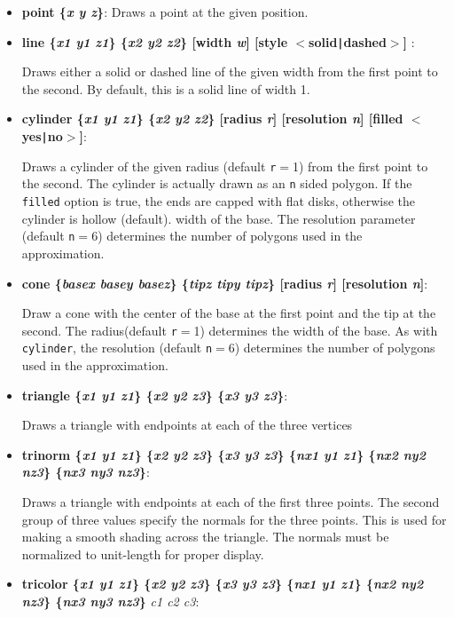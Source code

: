 \begin{itemize}
\item {\bf point \{{\it x y z}\}}:
Draws a point at the given position.

\item {\bf line \{{\it x1 y1 z1}\} \{{\it x2 y2 z2}\} [width {\it w}]
  [style $<$solid\verb!|!dashed$>$] }:

  Draws either a solid or dashed line of the given width from
the first point to the second.  By default, this is a solid line of
width 1.

\item {\bf cylinder \{{\it x1 y1 z1}\} \{{\it x2 y2 z2}\} [radius {\it r}]
  [resolution {\it n}] [filled $<$yes\verb!|!no$>$]}:

  Draws a cylinder of the given radius (default {\tt r}$=$1)
from the first point to the second.  The cylinder is actually drawn as
an {\tt n} sided polygon.  If the {\tt filled} option is true, the
ends are capped with flat disks, otherwise the cylinder is hollow (default).
width of the base. The resolution parameter
(default {\tt n}$=$6)
determines the number of polygons used in the approximation.

\item {\bf cone \{{\it basex basey basez}\} \{{\it tipz tipy tipz}\}
  [radius {\it r}] [resolution {\it n}]}:

  Draw a cone with the center of the base at the first point and
the tip at the second.  The radius(default {\tt r}$=$1) determines the
width of the base.  As with {\tt cylinder}, the resolution 
(default {\tt n}$=$6)
determines the number of polygons used in the approximation.

\item {\bf triangle \{{\it x1 y1 z1}\} \{{\it x2 y2 z3}\} \{{\it x3 y3 z3}\}}:

  Draws a triangle with endpoints at each of the three vertices

\item {\bf trinorm \{{\it x1 y1 z1}\} \{{\it x2 y2 z3}\} \{{\it x3 y3 z3}\}
  \{{\it nx1 y1 z1}\} \{{\it nx2 ny2 nz3}\} \{{\it nx3 ny3 nz3}\}}:

  Draws a triangle with endpoints at each of the first three
points.  The second group of three values specify the normals for the
three points.  This is used for making a smooth shading across the
triangle.  The normals must be normalized to unit-length for proper display.


\item {\bf tricolor \{{\it x1 y1 z1}\} \{{\it x2 y2 z3}\} \{{\it x3 y3 z3}\}
  \{{\it nx1 y1 z1}\} \{{\it nx2 ny2 nz3}\} \{{\it nx3 ny3 nz3}\}}
  {\it c1 c2 c3}: 


\end{itemize}
